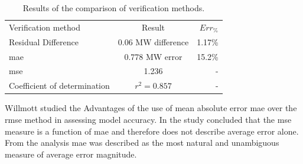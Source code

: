  \begin{table}[h!]
 	\label{Philip verification table}
 	\centering
 	\begin{tabular}{lcr}
 		\hline
 		Verification method & Result & $Err_{\%}$\\
 		\hhline{===}
 		Residual Difference          & 0.06 MW difference  & 1.17\% \\
 		\gls{mae} 					 & 0.778 MW error & 15.2\% \\
 		\gls{mse} 				     & 1.236    & -\\
 		Coefficient of determination & $r^2 =0.857$   & -\\
 		\hline
 	\end{tabular} 
 \caption{Results of the comparison of verification methods.}
 \end{table}
 
 	\par 
 	Willmott \cite{willmott2005advantages} studied the Advantages of the use of mean absolute error \gls{mae} over the \gls{rmse} method in assessing model accuracy. In the study \cite{willmott2005advantages} concluded that the \gls{mse} measure is a function of \gls{mae} and therefore does not describe average error alone. From the analysis \gls{mae} was described as the most natural and unambiguous measure of average error magnitude.

